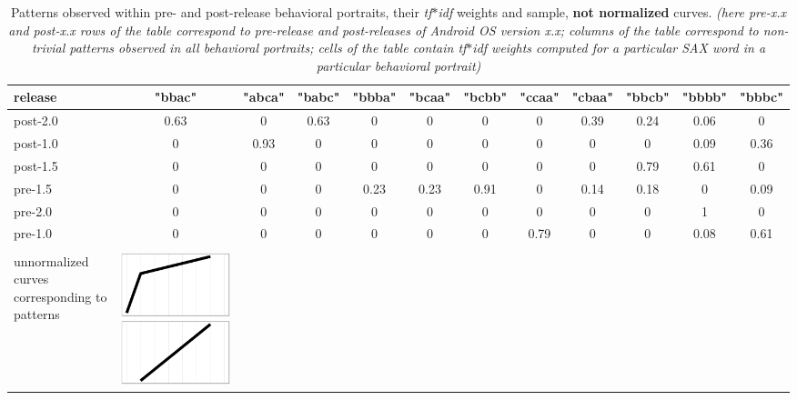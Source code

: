 \documentclass[conference]{worldcomp}
\begin{document}
\begin{table}
  \caption{Patterns observed within pre- and post-release behavioral portraits, their \textit{tf$\ast$idf} weights and sample, \textbf{not normalized} curves.
  \textit{(here pre-\textit{x.x} and post-\textit{x.x} rows of the table correspond to pre-release and post-releases of Android OS version x.x; 
   columns of the table correspond to non-trivial patterns observed in all behavioral portraits; cells of the table contain \textit{tf$\ast$idf} 
   weights computed for a particular SAX word in a particular behavioral portrait)}}
  \label{tab:tokens}
  \begin{tabular}{ | b{1.5cm} | c | c | c | c | c | c | c | c | c | c | c |}
  \hline
release & "bbac" & "abca" & "babc" & "bbba" & "bcaa" & "bcbb" & "ccaa" & "cbaa" & "bbcb" & "bbbb" & "bbbc"\\ 
  \hline
 post-2.0 & 0.63 & 0 & 0.63 & 0 & 0 & 0 & 0 & 0.39 & 0.24 & 0.06 & 0\\ 
 post-1.0 & 0 & 0.93 & 0 & 0 & 0 & 0 & 0 & 0 & 0 & 0.09 & 0.36\\ 
 post-1.5 & 0 & 0 & 0 & 0 & 0 & 0 & 0 & 0 & 0.79 & 0.61 & 0\\ 
 pre-1.5 & 0 & 0 & 0 & 0.23 & 0.23 & 0.91 & 0 & 0.14 & 0.18 & 0 & 0.09\\ 
 pre-2.0 & 0 & 0 & 0 & 0 & 0 & 0 & 0 & 0 & 0 & 1 & 0\\ 
 pre-1.0 & 0 & 0 & 0 & 0 & 0 & 0 & 0.79 & 0 & 0 & 0.08 & 0.61\\
 \hline 
 &  &  &  &  &  &  & &  &  &  & \\
 unnormalized curves corresponding to patterns &
 \includegraphics[scale=0.08]{figures/bbac.ps} &

\end{tabular}
\end{table}
\end{document}
